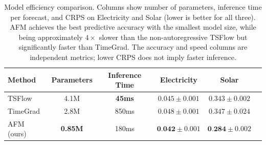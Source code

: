\documentclass[preprint,12pt,authoryear]{elsarticle}
\newcommand{\oldrev}[1]{#1}
\begin{document}
\begin{table}[htbp]
  \centering
  \caption{\oldrev{Model efficiency comparison. Columns show number of parameters, inference time per forecast, and CRPS on Electricity and Solar (lower is better for all three). AFM achieves the best predictive accuracy with the smallest model size, while being approximately $4\times$ slower than the non-autoregressive TSFlow but significantly faster than TimeGrad. The accuracy and speed columns are independent metrics; lower CRPS does not imply faster inference.}}
  \label{tab:efficiency}
\begin{small}
  \begin{tabular}{lccccc}
    \toprule
    Method & Parameters & Inference Time & Electricity & Solar \\
    \midrule
    TSFlow   & \phantom{0}4.1M & \phantom{0}\textbf{45ms}  & $0.045 \pm 0.001$ & $0.343 \pm 0.002$ \\
    TimeGrad & \phantom{0}2.8M & 850ms & $0.048 \pm 0.001$ & $0.347 \pm 0.024$ \\
    AFM \oldrev{(ours)} & \textbf{0.85M} & 180ms & $\textbf{0.042} \pm 0.001$ & $\textbf{0.284} \pm 0.002$ \\
    \bottomrule
  \end{tabular}
  \end{small}
\end{table}
\end{document}
